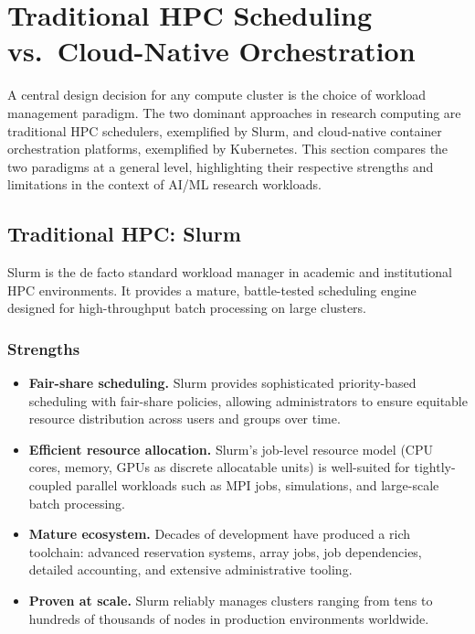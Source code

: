 \section{Traditional HPC Scheduling vs.\ Cloud-Native Orchestration}

A central design decision for any compute cluster is the choice of workload management paradigm. The two dominant approaches in research computing are traditional HPC schedulers, exemplified by Slurm, and cloud-native container orchestration platforms, exemplified by Kubernetes. This section compares the two paradigms at a general level, highlighting their respective strengths and limitations in the context of AI/ML research workloads.

\subsection{Traditional HPC: Slurm}

Slurm is the de facto standard workload manager in academic and institutional HPC environments. It provides a mature, battle-tested scheduling engine designed for high-throughput batch processing on large clusters.


\subsubsection{Strengths}

\begin{itemize}
    \item \textbf{Fair-share scheduling.} Slurm provides sophisticated priority-based scheduling with fair-share policies, allowing administrators to ensure equitable resource distribution across users and groups over time.
    \item \textbf{Efficient resource allocation.} Slurm's job-level resource model (CPU cores, memory, GPUs as discrete allocatable units) is well-suited for tightly-coupled parallel workloads such as MPI jobs, simulations, and large-scale batch processing.
    \item \textbf{Mature ecosystem.} Decades of development have produced a rich toolchain: advanced reservation systems, array jobs, job dependencies, detailed accounting, and extensive administrative tooling.
    \item \textbf{Proven at scale.} Slurm reliably manages clusters ranging from tens to hundreds of thousands of nodes in production environments worldwide.

\end{itemize}


